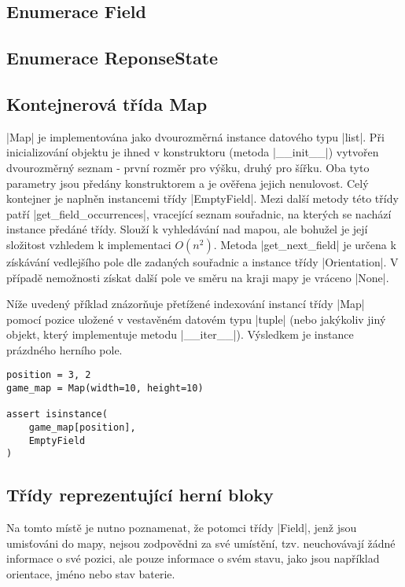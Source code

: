 \subsection{Enumerace Field}


\subsection{Enumerace ReponseState}


\subsection{Kontejnerová třída Map}

\ic|Map| je implementována jako dvourozměrná instance datového typu \ic|list|. Při inicializování objektu je ihned v konstruktoru (metoda \ic|__init__|) vytvořen dvourozměrný seznam - první rozměr pro výšku, druhý pro šířku. Oba tyto parametry jsou předány konstruktorem a je ověřena jejich nenulovost. Celý kontejner je naplněn instancemi třídy \ic|EmptyField|. Mezi další metody této třídy patří \ic|get_field_occurrences|, vracející seznam souřadnic, na kterých se nachází instance předáné třídy. Slouží k vyhledávání nad mapou, ale bohužel je její složitost vzhledem k implementaci $O(n^2)$. Metoda \ic|get_next_field| je určena k získávání vedlejšího pole dle zadaných souřadnic a instance třídy \ic|Orientation|. V případě nemožnosti získat další pole ve směru na kraji mapy je vráceno \ic|None|. 

Níže uvedený příklad znázorňuje přetížené indexování instancí třídy \ic|Map| pomocí pozice uložené v vestavěném datovém typu \ic|tuple| (nebo jakýkoliv jiný objekt, který implementuje metodu \ic|__iter__|). Výsledkem je instance prázdného herního pole.

\begin{lstlisting}[caption={Přetížené indexování třídy Map}]
position = 3, 2
game_map = Map(width=10, height=10)

assert isinstance(
	game_map[position],
	EmptyField
)
\end{lstlisting}

\subsection{Třídy reprezentující herní bloky}

Na tomto místě je nutno poznamenat, že potomci třídy \ic|Field|, jenž jsou umisťováni do mapy, nejsou zodpovědni za své umístění, tzv. neuchovávají žádné informace o své pozici, ale pouze informace o svém stavu, jako jsou například orientace, jméno nebo stav baterie. 

